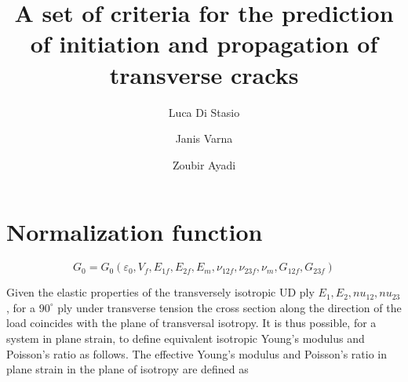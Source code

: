 \documentclass[review]{elsarticle}
\begin{document}
\begin{frontmatter}

\title{A set of criteria for the prediction of initiation and propagation of transverse cracks}


\author[nancy,lulea]{Luca Di Stasio}
\author[lulea]{Janis Varna}
\author[nancy]{Zoubir Ayadi}


\address[nancy]{Universit\'e de Lorraine, EEIGM, IJL, 6 Rue Bastien Lepage, F-54010 Nancy, France}
\address[lulea]{Lule\aa\ University of Technology, University Campus, SE-97187 Lule\aa, Sweden}

\begin{abstract}

\end{abstract}


\end{frontmatter}

\linenumbers

\section{Normalization function}

\begin{equation}
G_{0}=G_{0}\left(\varepsilon_{0},V_{f},E_{1f},E_{2f},E_{m},\nu_{12f},\nu_{23f},\nu_{m},G_{12f},G_{23f}\right)
\end{equation}

Given the elastic properties of the transversely isotropic UD ply $E_{1},E_{2},nu_{12},nu_{23}$, for a $90^{\circ}$ ply under transverse tension the cross section along the direction of the load coincides with the plane of transversal isotropy. It is thus possible, for a system in plane strain, to define equivalent isotropic Young's modulus and Poisson's ratio as follows. The effective Young's modulus and Poisson's ratio in plane strain in the plane of isotropy are defined as
\end{document}
